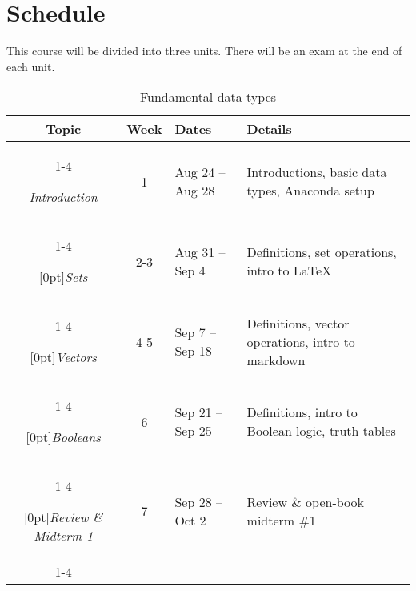 \documentclass[10pt]{memoir}
\begin{document}
\clearpage

\section{\textbf{Schedule}}

This course will be divided into three units. There will be an exam at the end of each unit. \\

\begin{table}[htb!]
\centering
\begin{tabular}{ccll}
    \textbf{Topic} & \textbf{Week} & \textbf{Dates} & \textbf{Details} \\
    \cmidrule[.1em](lr){1-4}
    
    \textit{Introduction} & 1 & Aug 24 -- Aug 28 & Introductions, basic data types, Anaconda setup \\
    \cmidrule[.1em](lr){1-4} 
 
     \multirow{1}{*}[0pt]{\textit{Sets}} %
        & 2-3 & Aug 31 -- Sep 4 & Definitions, set operations, intro to \LaTeX \\ 
        \cmidrule[.1em](lr){1-4}
        
    \multirow{1}{*}[0pt]{\textit{Vectors}} %
        & 4-5 & Sep 7 -- Sep 18 & Definitions, vector operations, intro to markdown \\ \cmidrule[.1em](lr){1-4}

    \multirow{1}{*}[0pt]{\textit{Booleans}} %
        & 6 & Sep 21 -- Sep 25 & Definitions, intro to Boolean logic, truth tables \\   \cmidrule[.1em](lr){1-4}    

   \multirow{1}{*}[0pt]{\textit{Review \& Midterm 1}} %
        & 7 & Sep 28 -- Oct 2 & Review \& open-book midterm \#1 \\ \cmidrule[.1em](lr){1-4}             

\end{tabular}\\
\caption{Fundamental data types}
\end{table}

\end{document}
